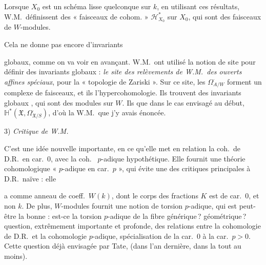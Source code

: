 \documentclass[11pt,a4paper]{article}
\begin{document}
Lorsque $X_0$ est un schéma lisse quelconque sur $k$, en utilisant ces
résultats, W.M.\ définissent  des
« faisceaux de cohom. »  $\mathcal{H}^{*}_{X_0}$ sur
$X_0$, qui sont des faisceaux de $W$-modules.

Cela ne donne pas encore d'invariants


globaux, comme on va  voir en avançant.
  W.M.\ ont utilisé la notion de
 site pour définir des invariants globaux : \emph{le site
des relèvements de W.M.\ des ouverts affines spéciaux}, pour la
« topologie de Zariski ». Sur ce site, les
$\Omega^{\cdot}_{A/W}$
forment un complexe de faisceaux, et ils 
l'hypercohomologie. Ils trouvent des invariants globaux
\ill{}, qui sont des modules sur $W$. Ils 
que dans le cas envisagé au début, 
$\mathbb{H}^{*}(\mathfrak{X}, \Omega^{\cdot}_{\mathfrak{X}/S})$, d'où la
 W.M.\ que j'y avais énoncée.

3) \emph{Critique de W.M.}

C'est une idée nouvelle importante, en ce qu'elle met en relation la
coh.\ de D.R.\ en car.\ $0$, avec la coh.\ 
$p$-adique hypothétique. Elle fournit une théorie cohomologique
« $p$-adique en car.\ $p$ », qui évite une des critiques principales
 à D.R.\ naïve : elle


a comme anneau de coeff.\ $W(k)$, dont le corps des fractions $K$ est de
car.\ $0$, et non $k$. De plus,  $W$-modules
   fournit
 une notion de torsion $p$-adique,
qui est peut-être  la bonne : est-ce la torsion
$p$-adique de la fibre générique\,? géométrique\,? \ill{}
\ill{}
question, extrêmement importante et profonde, des relations entre la
cohomologie de D.R.\ et la cohomologie $p$-adique, \ill{} \ill{}
spécialisation de la car.\ $0$ à la car.\ $p > 0$. Cette question déjà
 envisagée par Tate, (dans \ill{} \ill{} l'an
dernière, dans la \ill{} tout au moins).
\end{document}
